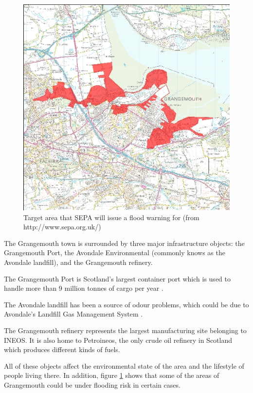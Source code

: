 \begin{figure}
    \centering
    \includegraphics[width=\textwidth]{data/grangemouthflooding}
    \caption{Target area that SEPA will issue a flood warning for (from http://www.sepa.org.uk/)}
    \label{fig:grangemouthflooding}
\end{figure}

The Grangemouth town is surrounded by three major infrastructure objects: the Grangemouth Port, the Avondale Environmental (commonly knows as the Avondale landfill), and the Grangemouth refinery. 

The Grangemouth Port is Scotland's largest container port which is used to handle more than 9 million tonnes of cargo per year \cite{port}. 

The Avondale landfill has been a source of odour problems, which could be due to Avondale's Landfill Gas Management System \cite{fhavondale}. 

The Grangemouth refinery represents the largest manufacturing site belonging to INEOS. It is also home to Petroineos, the only crude oil refinery in Scotland which produces different kinds of fuels. 

All of these objects affect the environmental state of the area and the lifestyle of people living there. In addition, figure \ref{fig:grangemouthflooding} shows that some of the areas of Grangemouth could be under flooding risk in certain cases. 

